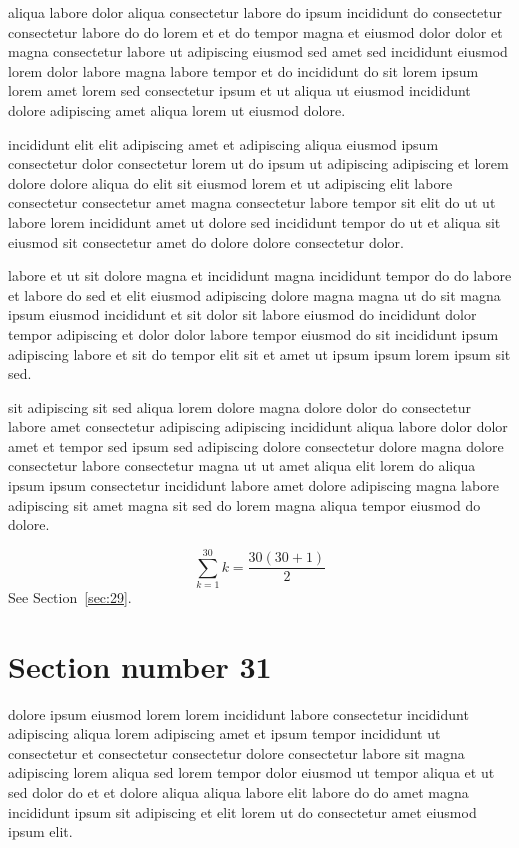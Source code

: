 \documentclass{article}
\begin{document}
aliqua labore dolor aliqua consectetur labore do ipsum incididunt do consectetur consectetur labore do do lorem et et do tempor magna et eiusmod dolor dolor et magna consectetur labore ut adipiscing eiusmod sed amet sed incididunt eiusmod lorem dolor labore magna labore tempor et do incididunt do sit lorem ipsum lorem amet lorem sed consectetur ipsum et ut aliqua ut eiusmod incididunt dolore adipiscing amet aliqua lorem ut eiusmod dolore.

incididunt elit elit adipiscing amet et adipiscing aliqua eiusmod ipsum consectetur dolor consectetur lorem ut do ipsum ut adipiscing adipiscing et lorem dolore dolore aliqua do elit sit eiusmod lorem et ut adipiscing elit labore consectetur consectetur amet magna consectetur labore tempor sit elit do ut ut labore lorem incididunt amet ut dolore sed incididunt tempor do ut et aliqua sit eiusmod sit consectetur amet do dolore dolore consectetur dolor.

labore et ut sit dolore magna et incididunt magna incididunt tempor do do labore et labore do sed et elit eiusmod adipiscing dolore magna magna ut do sit magna ipsum eiusmod incididunt et sit dolor sit labore eiusmod do incididunt dolor tempor adipiscing et dolor dolor labore tempor eiusmod do sit incididunt ipsum adipiscing labore et sit do tempor elit sit et amet ut ipsum ipsum lorem ipsum sit sed.

sit adipiscing sit sed aliqua lorem dolore magna dolore dolor do consectetur labore amet consectetur adipiscing adipiscing incididunt aliqua labore dolor dolor amet et tempor sed ipsum sed adipiscing dolore consectetur dolore magna dolore consectetur labore consectetur magna ut ut amet aliqua elit lorem do aliqua ipsum ipsum consectetur incididunt labore amet dolore adipiscing magna labore adipiscing sit amet magna sit sed do lorem magna aliqua tempor eiusmod do dolore.

\begin{equation} \sum_{k=1}^{30} k = \frac{30(30+1)}{2} \end{equation}
See Section~\ref{sec:29}.

\section{Section number 31}\label{sec:31}
dolore ipsum eiusmod lorem lorem incididunt labore consectetur incididunt adipiscing aliqua lorem adipiscing amet et ipsum tempor incididunt ut consectetur et consectetur consectetur dolore consectetur labore sit magna adipiscing lorem aliqua sed lorem tempor dolor eiusmod ut tempor aliqua et ut sed dolor do et et dolore aliqua aliqua labore elit labore do do amet magna incididunt ipsum sit adipiscing et elit lorem ut do consectetur amet eiusmod ipsum elit.
\end{document}
